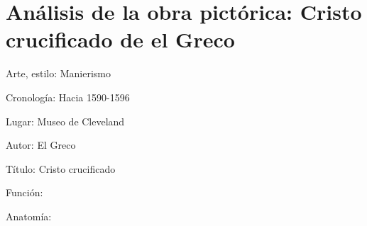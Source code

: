 \section{Análisis de la obra pictórica: Cristo crucificado de el Greco}

Arte, estilo: Manierismo

Cronología: Hacia 1590-1596

Lugar: Museo de Cleveland

Autor: El Greco

Título: Cristo crucificado 

Función:

Anatomía: